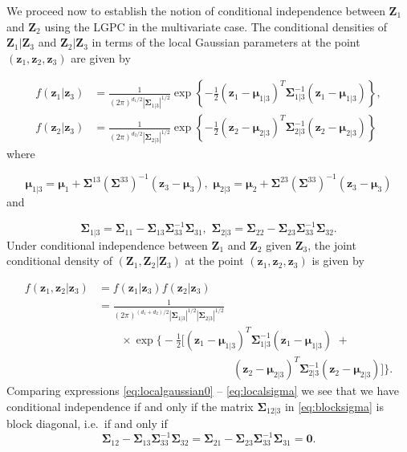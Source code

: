 \documentclass[
  12pt,
  letterpaper]{article}
\numberwithin{equation}{section}
\newcommand{\Z}{\bm{Z}}
\newcommand{\z}{\bm{z}}
\newcommand{\fmu}{\bm{\mu}}
\newcommand{\fSigma}{\bm{\Sigma}}
\begin{document}
We proceed now to establish the notion of conditional independence between \(\Z_1\) and \(\Z_2\) using the LGPC in the multivariate case. The conditional densities of \(\Z_1|\Z_3\) and \(\Z_2|\Z_3\) in terms of the local Gaussian parameters at the point \((\z_1, \z_2, \z_3)\) are given by

\begin{align*}
f(\z_1 |\z_3) &= \frac{1}{(2\pi)^{d_1/2}|\fSigma_{1|3}|^{1/2}} \exp \left\{-\frac{1}{2}(\z_1 - \fmu_{1|3})^T\fSigma_{1|3}^{-1}(\z_1 - \fmu_{1|3})\right\}, \\
f(\z_2 |\z_3) &= \frac{1}{(2\pi)^{d_2/2}|\fSigma_{2|3}|^{1/2}} \exp \left\{-\frac{1}{2}(\z_2 - \fmu_{2|3})^T\fSigma_{2|3}^{-1}(\z_2 - \fmu_{2|3})\right\} 
\end{align*}
where

\begin{equation}
\fmu_{1|3} = \fmu_1 + \fSigma^{13}\left(\fSigma^{33}\right)^{-1}\left(\z_3 - \fmu_3\right), \,\, \fmu_{2|3} = \fmu_2 + \fSigma^{23}\left(\fSigma^{33}\right)^{-1}\left(\z_3 - \fmu_3\right)  
\end{equation}
and

\begin{equation}
\fSigma_{1|3} = \fSigma_{11}-\fSigma_{13}\fSigma_{33}^{-1}\fSigma_{31}, \,\, \fSigma_{2|3} = \fSigma_{22}-\fSigma_{23}\fSigma_{33}^{-1}\fSigma_{32}.
\label{eq:localsigma}
\end{equation}
Under conditional independence between \(\Z_1\) and \(\Z_2\) given \(\Z_3\), the joint conditional density of \((\Z_1, \Z_2|\Z_3)\) at the point \((\z_1, \z_2, \z_3)\) is given by

\begin{align*}
f(\z_1, \z_2|\z_3) &= f(\z_1|\z_3)f(\z_2|\z_3) \\
&= \frac{1}{(2\pi)^{(d_1+d_2)/2}|\fSigma_{1|3}|^{1/2}|\fSigma_{2|3}|^{1/2}} \\
& \qquad \times \exp \Big\{-\frac{1}{2}\big[(\z_1 - \fmu_{1|3})^T\fSigma_{1|3}^{-1}(\z_1 - \fmu_{1|3}) \,\, + \\
& \qquad\qquad\qquad\qquad\qquad\qquad(\z_2 - \fmu_{2|3})^T\fSigma_{2|3}^{-1}(\z_2 - \fmu_{2|3})\big]\Big\}.
\end{align*}
Comparing expressions \eqref{eq:localgaussian0} -- \eqref{eq:localsigma} we see that we have conditional independence if and only if the matrix \(\fSigma_{12|3}\) in \eqref{eq:blocksigma} is block diagonal, i.e.~if and only if
\[\fSigma_{12} - \fSigma_{13}\fSigma_{33}^{-1} \fSigma_{32} = \fSigma_{21} - \fSigma_{23}\fSigma_{33}^{-1} \fSigma_{31} = \bm{0}.\]
\end{document}

